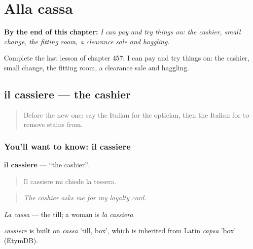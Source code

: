 
\chapter{Alla cassa}
\label{ch:it-alla-cassa}

\begin{chapteropening}
\textbf{By the end of this chapter:} \emph{I can pay and try things on: the cashier, small change, the fitting room, a clearance sale and haggling.}

Complete the last lesson of chapter 457: I can pay and try things on: the cashier, small change, the fitting room, a clearance sale and haggling.
\end{chapteropening}

\section[il cassiere]{il cassiere — the cashier}

\label{lesson:IT-C457-cassiere}



\begin{quote}
Before the new one: say the Italian for the optician, then the Italian for to remove stains from.
\end{quote}

\subsection*{You'll want to know: il cassiere}
\textbf{il cassiere} — \textquotedblleft{}the cashier\textquotedblright{}.

\begin{quote}
Il cassiere mi chiede la tessera.
\end{quote}

\begin{quote}
\emph{The cashier asks me for my loyalty card.}
\end{quote}

\emph{La cassa} — the till; a woman is \emph{la cassiera}.

\begin{cousinweb}
\emph{cassiere} is built on \emph{cassa} 'till, box', which is inherited from Latin \emph{capsa} 'box' (EtymDB).
\end{cousinweb}

